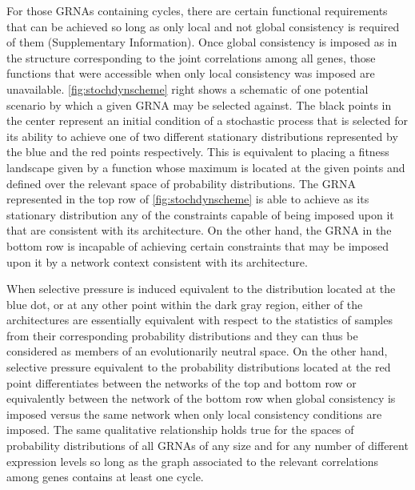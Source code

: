 For those GRNAs containing cycles, there are certain functional requirements that can be achieved so long as only local and not global consistency is required of them (Supplementary Information). Once global consistency is imposed as in the structure corresponding to the joint correlations among all genes, those functions that were accessible when only local consistency was imposed are unavailable. \ref{fig:stochdynscheme} right shows a schematic of one potential scenario by which a given GRNA may be selected against. The black points in the center represent an initial condition of a stochastic process that is selected for its ability to achieve one of two different stationary distributions represented by the blue and the red points respectively. This is equivalent to placing a fitness landscape given by a function whose maximum is located at the given points and defined over the relevant space of probability distributions. The GRNA represented in the top row of \ref{fig:stochdynscheme} is able to achieve as its stationary distribution any of the constraints capable of being imposed upon it that are consistent with its architecture. On the other hand, the GRNA in the bottom row is incapable of achieving certain constraints that may be imposed upon it by a network context consistent with its architecture.

When selective pressure is induced equivalent to the distribution located at the blue dot, or at any other point within the dark gray region, either of the architectures are essentially equivalent with respect to the statistics of samples from their corresponding probability distributions and they can thus be considered as members of an evolutionarily neutral space. On the other hand, selective pressure equivalent to the probability distributions located at the red point differentiates between the networks of the top and bottom row or equivalently between the network of the bottom row when global consistency is imposed versus the same network when only local consistency conditions are imposed. The same qualitative relationship holds true for the spaces of probability distributions of all GRNAs of any size and for any number of different expression levels so long as the graph associated to the relevant correlations among genes contains at least one cycle.
